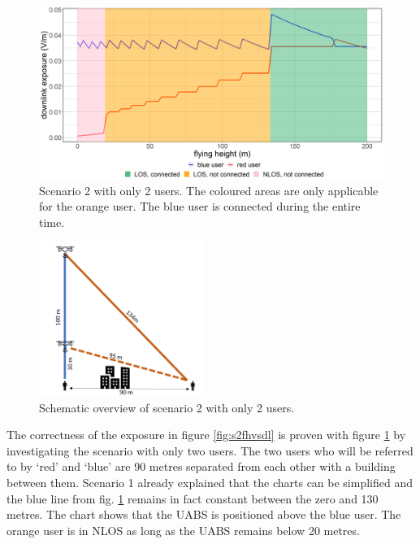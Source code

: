 \begin{figure}[bh!]
  \includegraphics[width=\textwidth]{../results/s2/prove.png}
  \caption{Scenario 2 with only 2 users. The coloured areas are only applicable for the orange user. The blue user is connected during the entire time.}
  \label{fig:prove}
\end{figure}


\begin{figure}
  \begin{center}
    \includegraphics[width=0.48\textwidth]{../results/s2/proveScenario.png}
  \end{center}
  \caption{Schematic overview of scenario 2 with only 2 users.}
  \label{fig:schematicprove}
\end{figure}

\newpage
The correctness of the exposure in figure \ref{fig:s2fhvsdl} is proven with figure \ref{fig:prove} by investigating the scenario with only two users. The two users who 
will be referred to by `red' and `blue' are 90 metres separated from each other with a building between them.
Scenario 1 already explained that the charts can be simplified and the blue line from fig. \ref{fig:prove} remains in fact constant between the zero and 130 metres.
The chart shows that the \gls{UABS} is positioned above the blue user. The orange user is in \gls{NLOS} as long as the \gls{UABS} remains below 20 metres.

